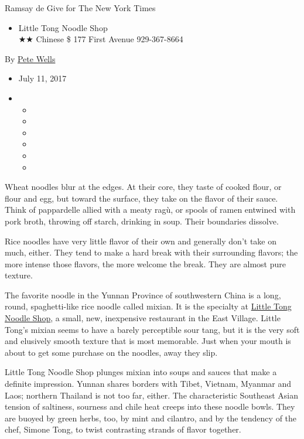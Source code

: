 Ramsay de Give for The New York Times

\begin{itemize}
\tightlist
\item
  Little Tong Noodle Shop\\
  ★★ Chinese \$ 177 First Avenue 929-367-8664
\end{itemize}

By \href{http://www.nytimes3xbfgragh.onion/by/pete-wells}{Pete Wells}

\begin{itemize}
\item
  July 11, 2017
\item
  \begin{itemize}
  \item
  \item
  \item
  \item
  \item
  \item
  \end{itemize}
\end{itemize}

Wheat noodles blur at the edges. At their core, they taste of cooked
flour, or flour and egg, but toward the surface, they take on the flavor
of their sauce. Think of pappardelle allied with a meaty ragù, or spools
of ramen entwined with pork broth, throwing off starch, drinking in
soup. Their boundaries dissolve.

Rice noodles have very little flavor of their own and generally don't
take on much, either. They tend to make a hard break with their
surrounding flavors; the more intense those flavors, the more welcome
the break. They are almost pure texture.

The favorite noodle in the Yunnan Province of southwestern China is a
long, round, spaghetti-like rice noodle called mixian. It is the
specialty at \href{https://www.littletong.com/}{Little Tong Noodle
Shop}, a small, new, inexpensive restaurant in the East Village. Little
Tong's mixian seems to have a barely perceptible sour tang, but it is
the very soft and elusively smooth texture that is most memorable. Just
when your mouth is about to get some purchase on the noodles, away they
slip.

Little Tong Noodle Shop plunges mixian into soups and sauces that make a
definite impression. Yunnan shares borders with Tibet, Vietnam, Myanmar
and Laos; northern Thailand is not too far, either. The characteristic
Southeast Asian tension of saltiness, sourness and chile heat creeps
into these noodle bowls. They are buoyed by green herbs, too, by mint
and cilantro, and by the tendency of the chef, Simone Tong, to twist
contrasting strands of flavor together.

